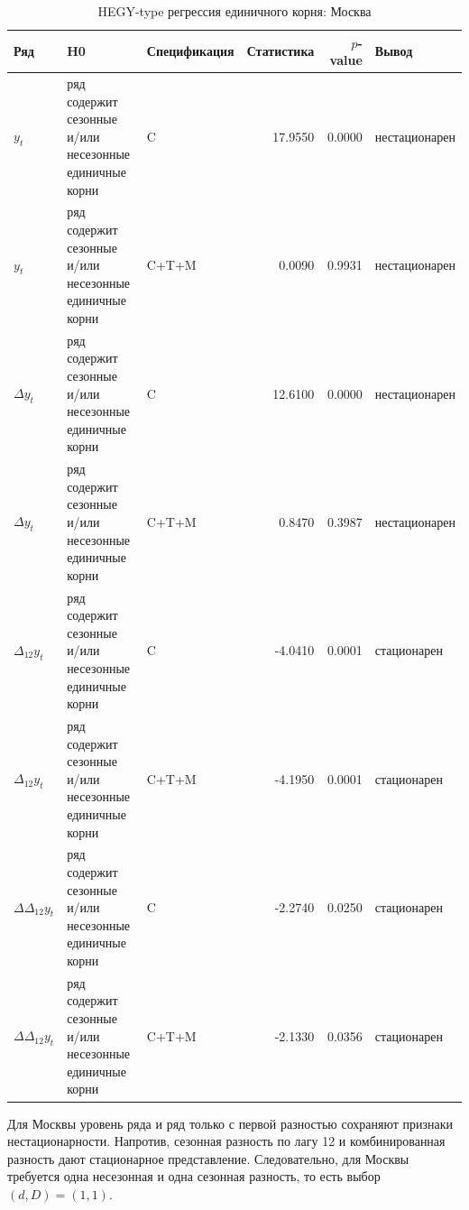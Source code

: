 \documentclass[12pt]{article}
\begin{document}
\begin{table}[H]
\centering
\caption{HEGY-type регрессия единичного корня: Москва}
\label{tab:hegy_moscow}
\small
\begin{tabularx}{\textwidth}{l >{\RaggedRight\arraybackslash}p{4.3cm} l r r l}
\toprule
Ряд & H0 & Спецификация & Статистика & $p$-value & Вывод \\
\midrule
$y_t$ & \makecell[l]{ряд содержит сезонные\\и/или несезонные\\единичные корни} & C & 17.9550 & 0.0000 & нестационарен \\
$y_t$ & \makecell[l]{ряд содержит сезонные\\и/или несезонные\\единичные корни} & C+T+M & 0.0090 & 0.9931 & нестационарен \\
$\Delta y_t$ & \makecell[l]{ряд содержит сезонные\\и/или несезонные\\единичные корни} & C & 12.6100 & 0.0000 & нестационарен \\
$\Delta y_t$ & \makecell[l]{ряд содержит сезонные\\и/или несезонные\\единичные корни} & C+T+M & 0.8470 & 0.3987 & нестационарен \\
$\Delta_{12} y_t$ & \makecell[l]{ряд содержит сезонные\\и/или несезонные\\единичные корни} & C & -4.0410 & 0.0001 & стационарен \\
$\Delta_{12} y_t$ & \makecell[l]{ряд содержит сезонные\\и/или несезонные\\единичные корни} & C+T+M & -4.1950 & 0.0001 & стационарен \\
$\Delta \Delta_{12} y_t$ & \makecell[l]{ряд содержит сезонные\\и/или несезонные\\единичные корни} & C & -2.2740 & 0.0250 & стационарен \\
$\Delta \Delta_{12} y_t$ & \makecell[l]{ряд содержит сезонные\\и/или несезонные\\единичные корни} & C+T+M & -2.1330 & 0.0356 & стационарен \\
\bottomrule
\end{tabularx}
\end{table}

Для Москвы уровень ряда и ряд только с первой разностью сохраняют признаки
нестационарности. Напротив, сезонная разность по лагу 12 и комбинированная
разность дают стационарное представление. Следовательно, для Москвы требуется
одна несезонная и одна сезонная разность, то есть выбор \((d,D)=(1,1)\).
\end{document}
